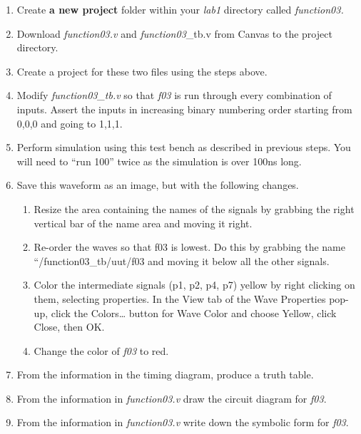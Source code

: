 \begin{enumerate}
\def\labelenumi{\arabic{enumi}.}
\item
  Create \textbf{a new project} folder within your \emph{lab1} directory
  called \emph{function03.}
\item
  Download \emph{function03.v} and \emph{function03}\_tb.v from Canvas
  to the project directory.
\item
  Create a project for these two files using the steps above.
\item
  Modify \emph{function03\_tb.v} so that \emph{f03} is run through every
  combination of inputs. Assert the inputs in increasing binary
  numbering order starting from 0,0,0 and going to 1,1,1.
\item
  Perform simulation using this test bench as described in previous
  steps. You will need to ``run 100'' twice as the simulation is over
  100ns long.
\item
  \protect\hypertarget{Part_3_Step_6}{}{}Save this waveform as an image,
  but with the following changes.

  \begin{enumerate}
  \def\labelenumii{\alph{enumii}.}
  \item
    Resize the area containing the names of the signals by grabbing the
    right vertical bar of the name area and moving it right.
  \item
    Re-order the waves so that f03 is lowest. Do this by grabbing the
    name ``/function03\_tb/uut/f03 and moving it below all the other
    signals.
  \item
    Color the intermediate signals (p1, p2, p4, p7) yellow by right
    clicking on them, selecting properties. In the View tab of the Wave
    Properties pop-up, click the Colors\ldots{} button for Wave Color
    and choose Yellow, click Close, then OK.
  \item
    Change the color of \emph{f03} to red.
  \end{enumerate}
\item
  \protect\hypertarget{Part_3_Step_7}{}{}From the information in the
  timing diagram, produce a truth table.
\item
  \protect\hypertarget{Part_3_Step_8}{}{}From the information in
  \emph{function03.v} draw the circuit diagram for \emph{f03}.
\item
  \protect\hypertarget{Part_3_Step_9}{}{}From the information in
  \emph{function03.v} write down the symbolic form for \emph{f03}.
\end{enumerate}


